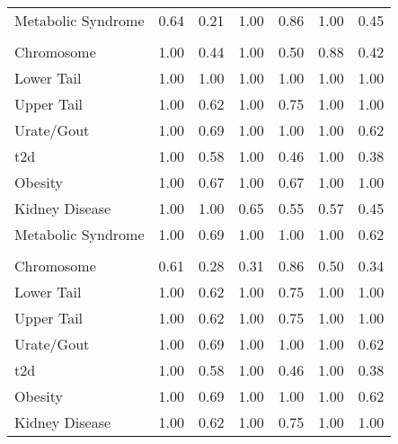 \documentclass[twoside,openright]{report}
\begin{document}
\begin{table}
\begin{tabular}[t]{lllllll}
\hspace{1em}Metabolic Syndrome & 0.64 & 0.21 & 1.00 & 0.86 & 1.00 & 0.45\\
\addlinespace[0.3em]
\multicolumn{7}{l}{\textbf{Fay and Wu's H}}\\
\hspace{1em}Chromosome & 1.00 & 0.44 & 1.00 & 0.50 & 0.88 & 0.42\\
\hspace{1em}Lower Tail & 1.00 & 1.00 & 1.00 & 1.00 & 1.00 & 1.00\\
\hspace{1em}Upper Tail & 1.00 & 0.62 & 1.00 & 0.75 & 1.00 & \vphantom{2} 1.00\\
\hspace{1em}Urate/Gout & 1.00 & 0.69 & 1.00 & 1.00 & 1.00 & \vphantom{2} 0.62\\
\hspace{1em}\Gls{t2d} & 1.00 & 0.58 & 1.00 & 0.46 & 1.00 & \vphantom{1} 0.38\\
\hspace{1em}Obesity & 1.00 & 0.67 & 1.00 & 0.67 & 1.00 & 1.00\\
\hspace{1em}Kidney Disease & 1.00 & 1.00 & 0.65 & 0.55 & 0.57 & 0.45\\
\hspace{1em}Metabolic Syndrome & 1.00 & 0.69 & 1.00 & 1.00 & 1.00 & \vphantom{2} 0.62\\
\addlinespace[0.3em]
\multicolumn{7}{l}{\textbf{Tajima's D}}\\
\hspace{1em}Chromosome & 0.61 & 0.28 & 0.31 & 0.86 & 0.50 & 0.34\\
\hspace{1em}Lower Tail & 1.00 & 0.62 & 1.00 & 0.75 & 1.00 & \vphantom{1} 1.00\\
\hspace{1em}Upper Tail & 1.00 & 0.62 & 1.00 & 0.75 & 1.00 & \vphantom{1} 1.00\\
\hspace{1em}Urate/Gout & 1.00 & 0.69 & 1.00 & 1.00 & 1.00 & \vphantom{1} 0.62\\
\hspace{1em}\Gls{t2d} & 1.00 & 0.58 & 1.00 & 0.46 & 1.00 & 0.38\\
\hspace{1em}Obesity & 1.00 & 0.69 & 1.00 & 1.00 & 1.00 & 0.62\\
\hspace{1em}Kidney Disease & 1.00 & 0.62 & 1.00 & 0.75 & 1.00 & 1.00\\

\end{tabular}
\end{table}
\end{document}
